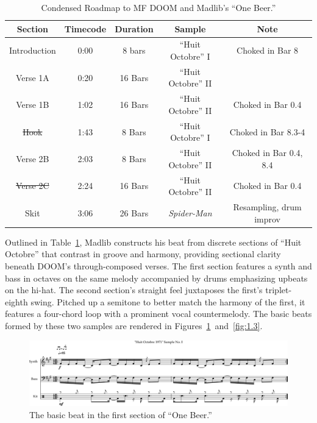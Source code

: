     \begin{table}[h!]
        \centering
            \begin{tabular}{|c|c|c|c|c|}
                 \hline
                  Section & Timecode & Duration & Sample & Note \\ \hline
                  Introduction & 0:00 & 8 bars & ``Huit Octobre'' I & Choked in Bar 8  \\ \hline
                  Verse 1A & 0:20 & 16 Bars & ``Huit Octobre'' II &  \\ \hline
                  Verse 1B & 1:02 & 16 Bars & ``Huit Octobre'' II & Choked in Bar 0.4 \\ \hline
                  \sout{Hook} & 1:43 & 8 Bars & ``Huit Octobre'' I & Choked in Bar 8.3-4 \\ \hline
                  Verse 2B & 2:03 & 8 Bars & ``Huit Octobre'' II & Choked in Bar 0.4, 8.4 \\ \hline
                  \sout{Verse 2C} & 2:24 & 16 Bars & ``Huit Octobre'' II & Choked in Bar 0.4 \\ \hline
                  Skit & 3:06 & 26 Bars & \textit{Spider-Man} & Resampling, drum improv \\ \hline
             \end{tabular}
        \caption{Condensed Roadmap to MF DOOM and Madlib's ``One Beer.''}
        \label{tab:onebeer}
    \end{table}

\normalsize Outlined in Table~\ref{tab:onebeer}, Madlib constructs his beat from discrete sections of ``Huit Octobre'' that contrast in groove and harmony, providing sectional clarity beneath DOOM's through-composed verses. The first section features a synth and bass in octaves on the same melody accompanied by drums emphasizing upbeats on the hi-hat. The second section's straight feel juxtaposes the first's triplet-eighth swing. Pitched up a semitone to better match the harmony of the first, it features a four-chord loop with a prominent vocal countermelody. The basic beats formed by these two samples are rendered in Figures~\ref{fig:1.2}~and~\ref{fig:1.3}.

\begin{figure}[h]
    \centering
    \includegraphics[width=\textwidth]{images/figures/chp 02/Figure-02.1-One-Beer-BB-I.pdf}
    \caption{The basic beat in the first section of ``One Beer.''}
    \label{fig:1.2}
\end{figure}

